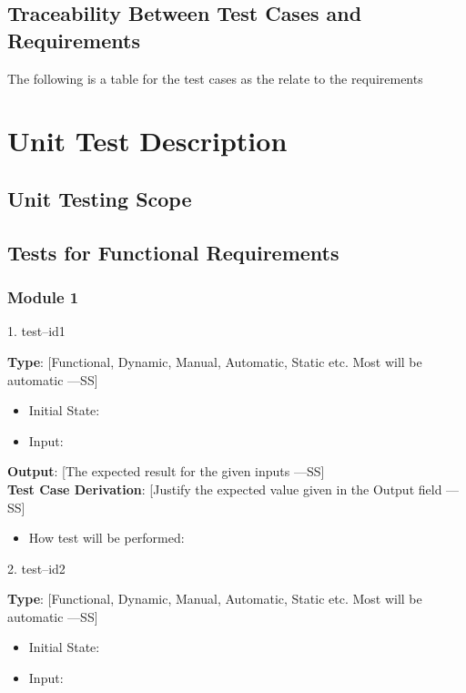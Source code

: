 \documentclass[12pt, titlepage]{article}
\begin{document}
\subsection{Traceability Between Test Cases and Requirements}

The following is a table for the test cases as the relate to the requirements

\section{Unit Test Description}

\subsection{Unit Testing Scope}

\subsection{Tests for Functional Requirements}

\subsubsection{Module 1}

1. test--id1

\textbf{Type}: [Functional, Dynamic, Manual, Automatic, Static etc. Most will be automatic —SS]\\
\begin{itemize}
  \item Initial State:
  \item Input:
\end{itemize}

\textbf{Output}: [The expected result for the given inputs —SS]\\
\textbf{Test Case Derivation}: [Justify the expected value given in the Output field —SS]\\
\begin{itemize}
  \item How test will be performed:
\end{itemize}

2. test--id2

\textbf{Type}: [Functional, Dynamic, Manual, Automatic, Static etc. Most will be automatic —SS]\\
\begin{itemize}
  \item Initial State:
  \item Input:
\end{itemize}
\end{document}

